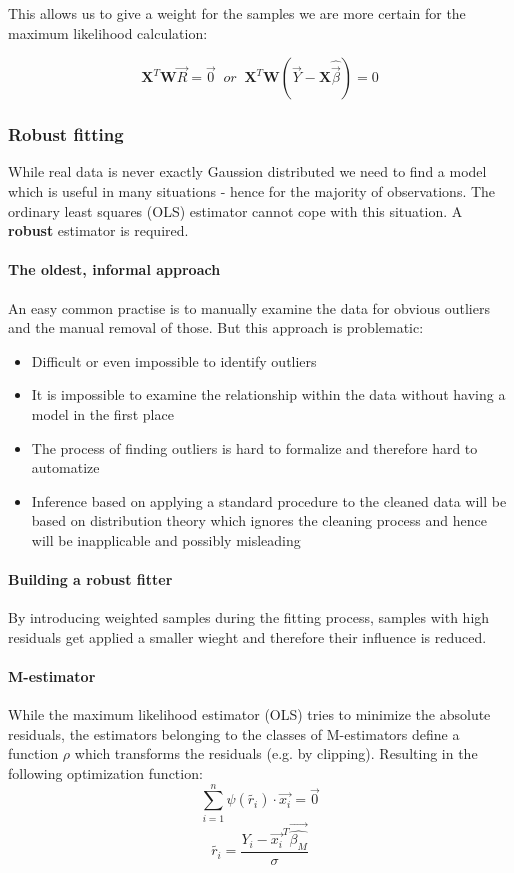 This allows us to give a weight for the samples we are more certain for the maximum likelihood calculation:

\begin{equation*}
\bm{X}^T\bm{W}\vec{R} = \vec{0}\;\; or \;\;
\bm{X}^T\bm{W}(\vec{Y}-\bm{X}\hat{\vec{\beta}}) = 0
\end{equation*}

\subsubsection{Robust fitting}
While real data is never exactly Gaussion distributed we need to find a model which is useful in many situations - hence for the majority of observations. The ordinary least squares (OLS) estimator cannot cope with this situation. A \textbf{robust} estimator is required.

\paragraph{The oldest, informal approach}

An easy common practise is to manually examine the data for obvious outliers and the manual removal of those. But this approach is problematic:
\begin{itemize}
	\tightlist
	\item Difficult or even impossible to identify outliers
	\item It is impossible to examine the relationship within the data without having a model in the first place
	\item The process of finding outliers is hard to formalize and therefore hard to automatize
	\item Inference based on applying a standard procedure to the cleaned data will be based on distribution theory which ignores the cleaning process and hence will be inapplicable and possibly misleading
\end{itemize}

\paragraph{Building a robust fitter}
By introducing weighted samples during the fitting process, samples with high residuals get applied a smaller wieght and therefore their influence is reduced.

\paragraph{M-estimator}
While the maximum likelihood estimator (OLS) tries to minimize the absolute residuals, the estimators belonging to the classes of M-estimators define a function $\rho$ which transforms the residuals (e.g. by clipping). Resulting in the following optimization function:
\begin{equation*}
\sum_{i=1}^{n}\psi(\tilde{r_i}) \cdot \vec{x_i} = \vec{0}
\end{equation*}
\begin{equation*}
\tilde{r_i} = \frac{Y_i-\vec{x_i}^T\vec{\hat{\beta_M}}}{\sigma}
\end{equation*}

